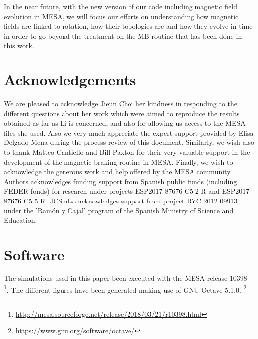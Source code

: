 \documentclass[fleqn,usenatbib]{mnras}
\begin{document}
In the near future, with the new version of our code including magnetic field evolution in MESA, we will focus our efforts on understanding how magnetic fields are linked to rotation, how their topologies are and how they evolve in time in order to go beyond the treatment on the MB routine that has been done in this work.\par



\section*{Acknowledgements}
We are pleased to acknowledge Jieun Choi her kindness in responding to the different questions about her work which were aimed to reproduce the results obtained as far as Li is concerned, and also for allowing us access to the MESA files she used. Also we very much appreciate the expert support provided by Elisa Delgado-Mena during the process review of this document. Similarly, we wish also to thank Matteo Cantiello and Bill Paxton for their very valuable support in the development of the magnetic braking routine in MESA. Finally, we wish to acknowledge the generous work and help offered by the MESA community. Authors acknowledges funding support from Spanish public funds (including FEDER fonds) for research under projects ESP2017-87676-C5-2-R and ESP2017-87676-C5-5-R. JCS also acknowledges support from project RYC-2012-09913 under the 'Ram\'on y Cajal' program of the Spanish Ministry of Science and Education.

\section*{Software}
The simulations used in this paper been executed with the MESA release 10398 \footnote{\url{http://mesa.sourceforge.net/release/2018/03/21/r10398.html}}. The different figures have been generated making use of GNU Octave 5.1.0. \footnote{\url{https://www.gnu.org/software/octave/}} 








\end{document}
